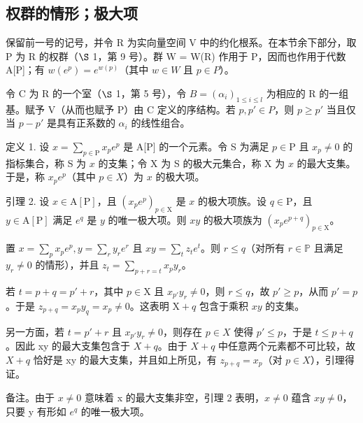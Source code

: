 \subsection{权群的情形；极大项}

保留前一号的记号，并令 R 为实向量空间 V 中的约化根系。在本节余下部分，取 P 为 R 的权群（\(\S\) 1，第 9 号）。群 W = W(R) 作用于 P，因而也作用于代数 A{[}P{]}；有 \(w(e^{p}) = e^{w(p)}\)（其中 \(w \in W\) 且 \(p \in P\)）。

令 C 为 R 的一个室（\(\S\) 1，第 5 号），令 \(B = (\alpha_{i})_{1 \leqslant i \leqslant l}\) 为相应的 R 的一组基。赋予 V（从而也赋予 P）由 C 定义的序结构。若 \(p, p' \in P\)，则 \(p \geqslant p'\) 当且仅当 \(p - p'\) 是具有正系数的 \(\alpha_{i}\) 的线性组合。

定义 1. 设 \(x = \sum_{p \in \mathrm{P}} x_p e^p\) 是 A{[}P{]} 的一个元素。令 S 为满足 \(p \in \mathrm{P}\) 且 \(x_p \neq 0\) 的指标集合，称 S 为 \(x\) 的支集；令 X 为 S 的极大元集合，称 X 为 \(x\) 的最大支集。于是，称 \(x_p e^p\)（其中 \(p \in X\)）为 \(x\) 的极大项。

引理 2. 设 \(x \in \mathrm{A}[\mathrm{P}]\)，且 \((x_{p}e^{p})_{p \in \mathrm{X}}\) 是 \(x\) 的极大项族。设 \(q \in \mathrm{P}\)，且 \(y \in \mathrm{A}[\mathrm{P}]\) 满足 \(e^{q}\) 是 \(y\) 的唯一极大项。则 \(xy\) 的极大项族为 \((x_{p}e^{p + q})_{p \in \mathrm{X}}\)。

置 \(x = \sum_{p} x_{p} e^{p}, y = \sum_{r} y_{r} e^{r}\) 且 \(xy = \sum_{t} z_{t} e^{t}\)。则 \(r \leqslant q\)（对所有 \(r \in \mathbb{P}\) 且满足 \(y_{r} \neq 0\) 的情形），并且 \(z_{t} = \sum_{p + r = t} x_{p} y_{r}\)。

若 \(t = p + q = p' + r\)，其中 \(p \in \mathrm{X}\) 且 \(x_{p'}y_r \neq 0\)，则 \(r \leqslant q\)，故 \(p' \geqslant p\)，从而 \(p' = p\)。于是 \(z_{p + q} = x_p y_q = x_p \neq 0\)。这表明 \(\mathrm{X} + q\) 包含于乘积 \(xy\) 的支集。

另一方面，若 \(t = p' + r\) 且 \(x_{p'} y_r \neq 0\)，则存在 \(p \in X\) 使得 \(p' \leqslant p\)，于是 \(t \leqslant p + q\)。因此 xy 的最大支集包含于 \(X + q\)。由于 \(X + q\) 中任意两个元素都不可比较，故 \(X + q\) 恰好是 xy 的最大支集，并且如上所见，有 \(z_{p+q} = x_p\)（对 \(p \in X\)），引理得证。

备注。由于 \(x \neq 0\) 意味着 x 的最大支集非空，引理 2 表明，\(x \neq 0\) 蕴含 \(xy \neq 0\)，只要 y 有形如 \(e^{q}\) 的唯一极大项。

